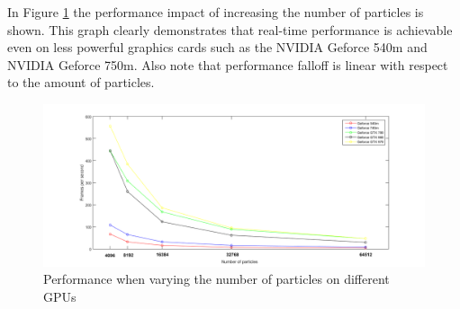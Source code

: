 In Figure \ref{fig:graphen} the performance impact of increasing the number of
particles is shown. This graph clearly demonstrates that real-time performance
is achievable even on less powerful graphics cards such as the NVIDIA Geforce
540m and NVIDIA Geforce 750m. Also note that performance falloff is linear with
respect to the amount of particles.

\begin{figure}[H]
  \centering
  \includegraphics[width=1.1\textwidth]{img/graph.png}
  \caption{Performance when varying the number of particles on different GPUs}
  \label{fig:graphen}
\end{figure}



